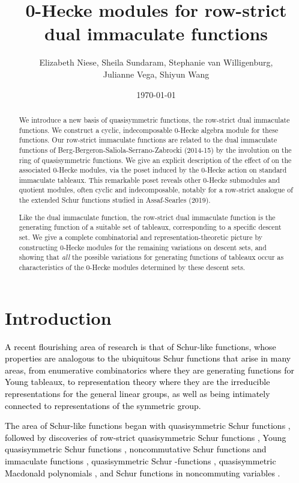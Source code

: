 \documentclass[12pt,letterpaper]{amsart}
\author[Niese, Sundaram, van Willigenburg, Vega, Wang]{Elizabeth Niese, Sheila Sundaram, Stephanie van Willigenburg,\\ Julianne Vega, Shiyun Wang}
\title[Row-strict 0-Hecke algebra modules]{0-Hecke modules for row-strict dual immaculate functions}
\date{\today}
\newcommand{\svw}{\textcolor{black}}
\newcommand{\sheila}{\textcolor{black}}
\theoremstyle{definition}
\begin{document}
\subjclass{\svw{05E05, 05E10, 06A07, 16T05, 20C08.}}
\keywords{\svw{Quasisymmetric functions, dual immaculate functions, 0-Hecke algebra, indecomposable module.}}

\begin{abstract}{We introduce a new basis of quasisymmetric functions, the row-strict dual immaculate functions.  We construct a cyclic, indecomposable 0-Hecke algebra module for these functions.   Our row-strict immaculate functions are related to the dual immaculate functions of Berg-Bergeron-Saliola-Serrano-Zabrocki (2014-15) by the involution  on the ring  of quasisymmetric functions.  We give an explicit description of the effect of  on the associated 0-Hecke modules, via the poset induced by the 0-Hecke action on standard immaculate tableaux.  This remarkable poset reveals other 0-Hecke submodules and quotient modules, often cyclic and indecomposable, notably for a row-strict analogue of the extended Schur functions studied in Assaf-Searles (2019). 

Like the dual immaculate function, the  row-strict dual immaculate function is the generating function of a suitable set of tableaux, corresponding to a specific  descent set. We give a complete combinatorial and representation-theoretic picture by constructing 0-Hecke modules for the remaining variations on descent sets,  and showing that \emph{all} the possible variations for generating functions of tableaux occur as characteristics of the 0-Hecke modules determined by these descent sets. }
\end{abstract}
\maketitle
\tableofcontents
\section{Introduction}\label{sec:Intro}
\svw{A recent flourishing area of research is that of Schur-like functions, whose properties are analogous to the ubiquitous Schur functions that arise in many areas, from enumerative combinatorics where they are generating functions for Young tableaux, to representation theory where they are the irreducible representations for the general linear groups, \sheila{as well as being intimately connected to representations of the symmetric group}.}

\svw{The area of Schur-like functions began with quasisymmetric Schur functions \cite{HLMvW2011},  followed by discoveries of row-strict quasisymmetric Schur functions \cite{MR2014}, Young quasisymmetric Schur functions \cite{LMvW2013, MN2015}, noncommutative Schur functions \cite{BLvW2011} and immaculate functions \cite{BBSSZ2014},  quasisymmetric Schur -functions \cite{JL2015},   quasisymmetric Macdonald polynomials \cite{CHMMW2022}, and Schur functions in noncommuting variables \cite{ALvW2021}.}
\end{document}
